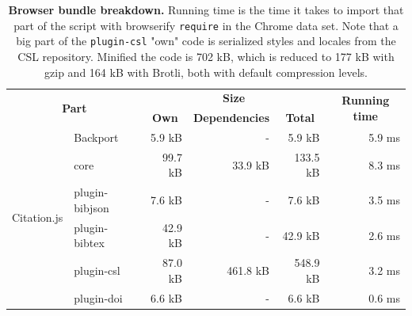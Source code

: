 \documentclass[fleqn,10pt,lineno]{wlpeerj} %
\begin{document}
\begin{table}[bt!]
\caption{\textbf{Browser bundle breakdown.} Running time is the time it takes to import that part of the script with browserify \texttt{require} in the Chrome data set. Note that a big part of the \texttt{plugin-csl} "own" code is serialized styles and locales from the CSL repository. Minified the code is 702 kB, which is reduced to 177 kB with gzip and 164 kB with Brotli, both with default compression levels.}
\label{table:size}
\begin{tabular}{|l|l|r|r|r|r|}
\hline
\multicolumn{2}{|c|}{\multirow{2}{*}{\textbf{Part}}} & \multicolumn{3}{c|}{\textbf{Size}}                                                                                   & \multicolumn{1}{c|}{\multirow{2}{*}{\textbf{Running time}}} \\ \cline{3-5}
\multicolumn{2}{|c|}{}                               & \multicolumn{1}{c|}{\textbf{Own}} & \multicolumn{1}{c|}{\textbf{Dependencies}} & \multicolumn{1}{c|}{\textbf{Total}} & \multicolumn{1}{c|}{}                                       \\ \hline
\multirow{10}{*}{Citation.js}    & Backport          & 5.9 kB                            & -                                          & 5.9 kB                              & 5.9 ms                                                      \\ \cline{2-6} 
                                 & core              & 99.7 kB                           & 33.9 kB                                    & 133.5 kB                            & 8.3 ms                                                      \\ \cline{2-6} 
                                 & plugin-bibjson    & 7.6 kB                            & -                                          & 7.6 kB                              & 3.5 ms                                                      \\ \cline{2-6} 
                                 & plugin-bibtex     & 42.9 kB                           & -                                          & 42.9 kB                             & 2.6 ms                                                      \\ \cline{2-6} 
                                 & plugin-csl        & 87.0 kB                           & 461.8 kB                                   & 548.9 kB                            & 3.2 ms                                                      \\ \cline{2-6} 
                                 & plugin-doi        & 6.6 kB                            & -                                          & 6.6 kB                              & 0.6 ms                                                      \\ \cline{2-6} 

\end{tabular}
\end{table}
\end{document}
